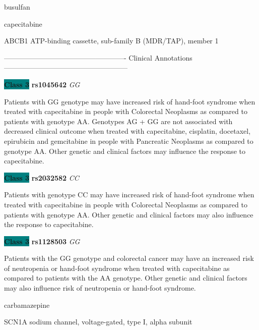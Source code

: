 \documentclass{resume} %
\begin{document}
\begin{rSection}{ busulfan }
\end{rSection}\begin{rSection}{ capecitabine }
\item[]

\begin{rSubsection}{ ABCB1 }{ ATP-binding cassette, sub-family B (MDR/TAP), member 1 }{}{}
\item[]

\item[] ---------------------------------------------------- Clinical Annotations -----------------------------------------------------\newline
\item \textbf{\colorbox{teal} {Class 3}} \textbf{ rs1045642 } \textit{ GG }
\item[] Patients with GG genotype may have increased risk of hand-foot syndrome when treated with capecitabine in people with Colorectal Neoplasms as compared to patients with genotype AA. Genotypes AG + GG are not associated with decreased clinical outcome when treated with capecitabine, cisplatin, docetaxel, epirubicin and gemcitabine in people with Pancreatic Neoplasms as compared to genotype AA. Other genetic and clinical factors may influence the response to capecitabine.\item \textbf{\colorbox{teal} {Class 3}} \textbf{ rs2032582 } \textit{ CC }
\item[] Patients with genotype CC may have increased risk of hand-foot syndrome when treated with capecitabine in people with Colorectal Neoplasms as compared to patients with genotype AA. Other genetic and clinical factors may also influence the response to capecitabine.\item \textbf{\colorbox{teal} {Class 3}} \textbf{ rs1128503 } \textit{ GG }
\item[] Patients with the GG genotype and colorectal cancer may have an increased risk of neutropenia or hand-foot syndrome when treated with capecitabine as compared to patients with the AA genotype. Other genetic and clinical factors may also influence risk of neutropenia or hand-foot syndrome.
\end{rSubsection}

\end{rSection}\begin{rSection}{ carbamazepine }
\item[]

\begin{rSubsection}{ SCN1A }{ sodium channel, voltage-gated, type I, alpha subunit }{}{}
\item[]


\end{rSubsection}
\end{rSection}
\end{document}
